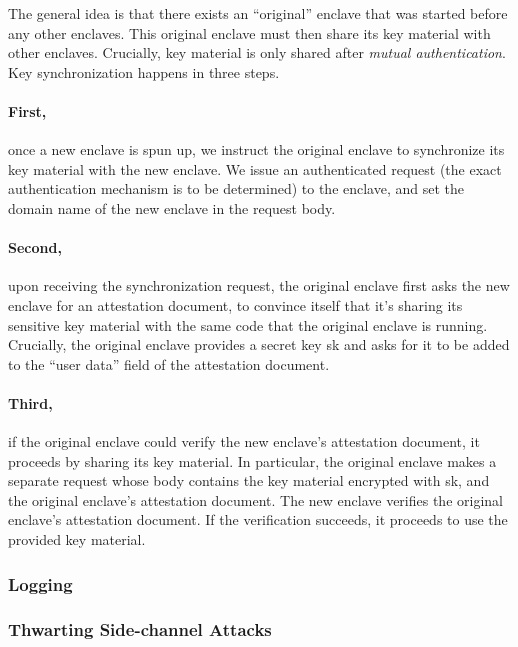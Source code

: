 The general idea is that there exists an ``original'' enclave that was started
before any other enclaves. This original enclave must then share its key
material with other enclaves.  Crucially, key material is only shared after
\emph{mutual authentication}.  Key synchronization happens in three steps.


\paragraph{First,} once a new enclave is spun up, we instruct the original
enclave to synchronize its key material with the new enclave. We issue an
authenticated request (the exact authentication mechanism is to be determined)
to the enclave, and set the domain name of the new enclave in the request body.

\paragraph{Second,} upon receiving the synchronization request, the original
enclave first asks the new enclave for an attestation document, to convince
itself that it’s sharing its sensitive key material with the same code that the
original enclave is running. Crucially, the original enclave provides a secret
key sk and asks for it to be added to the “user data” field of the attestation
document.

\paragraph{Third,} if the original enclave could verify the new enclave’s
attestation document, it proceeds by sharing its key material. In particular,
the original enclave makes a separate request whose body contains the key
material encrypted with sk, and the original enclave’s attestation document.
The new enclave verifies the original enclave’s attestation document. If the
verification succeeds, it proceeds to use the provided key material.

\subsubsection{Logging}
\label{sec:logging}


\subsubsection{Thwarting Side-channel Attacks}
\label{sec:side-channels}

